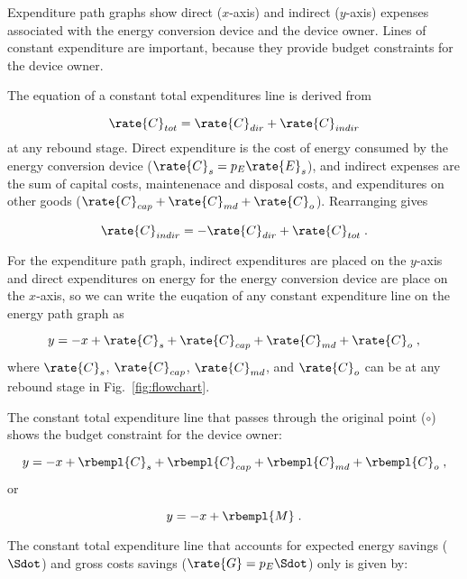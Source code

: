 Expenditure path graphs show direct ($x$-axis) and indirect ($y$-axis)
expenses associated with the energy conversion device 
and the device owner.
Lines of constant expenditure are important, 
because they provide budget constraints for the device owner.

The equation of a constant total expenditures line is derived from 

\begin{equation}
  \rate{C}_{tot} = \rate{C}_{dir} + \rate{C}_{indir}
\end{equation}
%
at any rebound stage.
Direct expenditure is the cost of energy consumed by the energy conversion device
($\rate{C}_s = p_E \rate{E}_s$), and 
indirect expenses are the sum of capital costs, 
maintenenace and disposal costs, and 
expenditures on other goods
($\rate{C}_{cap} + \rate{C}_{md} + \rate{C}_o$).
Rearranging gives

\begin{equation}
  \rate{C}_{indir} = - \rate{C}_{dir} + \rate{C}_{tot} \; .
\end{equation}

For the expenditure path graph,
indirect expenditures are placed on the $y$-axis
and direct expenditures on energy for the energy conversion device are place on the $x$-axis,
so we can write the euqation of any
constant expenditure line on the energy path graph as

\begin{equation}
  y = -x + \rate{C}_s + \rate{C}_{cap} + \rate{C}_{md} + \rate{C}_o \; ,
\end{equation}
%
where $\rate{C}_s$, $\rate{C}_{cap}$, $\rate{C}_{md}$, and $\rate{C}_o$
can be at any rebound stage in Fig.~\ref{fig:flowchart}.

The constant total expenditure line 
that passes through the original point ($\circ$)
shows the budget constraint for the device owner:

\begin{equation}
  y = -x + \rbempl{C}_s + \rbempl{C}_{cap} + \rbempl{C}_{md} + \rbempl{C}_o \; ,
\end{equation}
%
or

\begin{equation}
  y = -x + \rbempl{M} \; .
\end{equation}

The constant total expenditure line 
that accounts for expected energy savings ($\Sdot$) 
and gross costs savings ($\rate{G} = p_E \Sdot$) only 
is given by:

